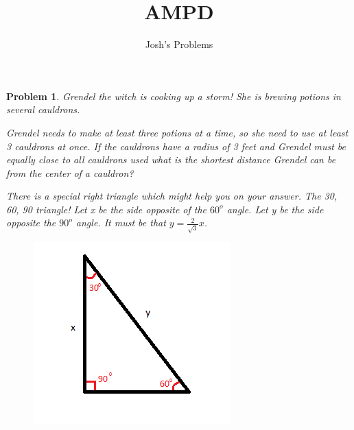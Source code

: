 \documentclass{article}
\title{AMPD}
\author{Josh's Problems}
\newtheorem{problem}{Problem}
\begin{document}
\maketitle

\begin{problem}
Grendel the witch is cooking up a storm! She is brewing potions in several cauldrons.

Grendel needs to make at least three potions at a time, so she need to use at least 3 cauldrons at once. If the cauldrons have a radius of 3 feet and Grendel must be equally close to all cauldrons used what is the shortest distance Grendel can be from the center of a cauldron?

There is a special right triangle which might help you on your answer. The 30, 60, 90 triangle! Let x be the side opposite of the $60^o$ angle. Let y be the side opposite the $90^o$ angle. It must be that $y = \frac{2}{\sqrt{3}}x$.

\begin{figure}[h!]
\centering
\includegraphics[scale=.5]{triangle}
\end{figure}

\end{problem}
\end{document}

